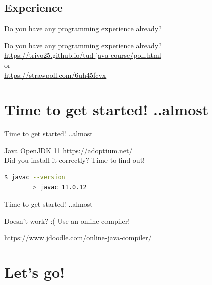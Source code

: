 \subsection{Experience}
\begin{frame}{Do you have any programming experience already?}
	\begin{center}
		Do you have any programming experience already?\\
		\url{https://trivo25.github.io/tud-java-course/poll.html}\\
		or\\
		\url{https://strawpoll.com/6uh45fcvx}
	\end{center}
\end{frame}



\section{Time to get started! ..almost}

\begin{frame}[fragile]{Time to get started! ..almost}
	\begin{center}
		Java OpenJDK 11 \url{https://adoptium.net/}
		\\
		Did you install it correctly? Time to find out!
	\end{center}

	\begin{lstlisting}[language=bash]
		$ javac --version
		> javac 11.0.12
	\end{lstlisting}
\end{frame}



\begin{frame}[fragile]{Time to get started! ..almost}
	\begin{center}
		Doesn't work? :(
		Use an online compiler!

		\url{https://www.jdoodle.com/online-java-compiler/}
	\end{center}
\end{frame}




\section{Let's go!}


